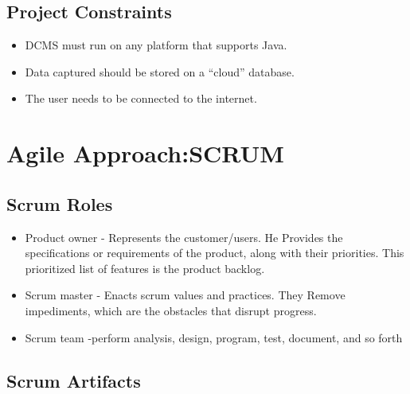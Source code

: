 \documentclass[11 pt]{article}
\begin{document}
\subsection{Project Constraints}
\begin{itemize}
\item
DCMS must run on any platform that supports Java.
\item
Data captured should be stored on a “cloud” database.
\item
The user needs to be connected to the internet.
\end{itemize}

\section{Agile Approach:SCRUM}
\subsection{Scrum Roles}
\begin{itemize}
\item
Product owner - Represents the customer/users. He Provides the specifications or requirements of the product, along with their priorities. This prioritized list of features is the product backlog.
\item
Scrum master - Enacts scrum values and practices. They Remove impediments, which are the obstacles that disrupt progress.
\item
Scrum team -perform analysis, design, program, test, document, and so forth
\end{itemize}
\subsection{Scrum Artifacts}
\end{document}
